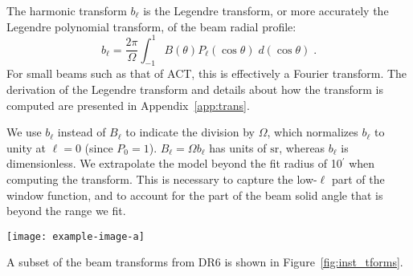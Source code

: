 The harmonic transform $b_{\ell}$ is the Legendre transform, or more accurately the Legendre polynomial transform, of the beam radial profile:
\begin{equation}
b_{\ell} = \frac{2\pi}{\Omega}\int_{-1}^{1} B(\theta)P_{\ell}(\cos\theta)\; d(\cos\theta) \; .
\label{eq:legendre}
\end{equation}
For small beams such as that of ACT, this is effectively a Fourier transform. The derivation of the Legendre transform and details about how the transform is computed are presented in Appendix~\ref{app:trans}.

We use $b_{\ell}$ instead of $B_{\ell}$ to indicate the division by $\Omega$, which normalizes $b_{\ell}$ to unity at $\ell = 0$ (since $P_0 = 1$). $B_{\ell} = \Omega b_{\ell}$ has units of $\mathrm{sr}$, whereas $b_{\ell}$ is dimensionless. We extrapolate the model beyond the fit radius of 10$^{\prime}$ when computing the transform.
This is necessary to capture the low-$\ell$ part of the window function, and to account for the part of the beam solid angle that is beyond the range we fit.

\begin{figure*}
    \centering
    \texttt{[image: example-image-a]}
    \label{fig:inst_tforms}
    \vspace{1em}
\end{figure*}

A subset of the beam transforms from DR6 is shown in Figure~\ref{fig:inst_tforms}. 




